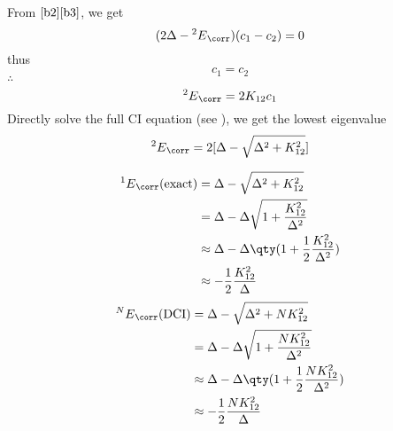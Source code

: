 \documentclass[a4paper]{article}
\begin{document}
From $ \eqref{b2}\eqref{b3} $, we get
\begin{equation}\label{key}
(2\Delta - {^2 E}_{\corr})(c_1 - c_2) = 0
\end{equation}
thus
\begin{equation}\label{key}
c_1 = c_2
\end{equation}
$ \therefore $
\begin{equation}\label{key}
{^2 E}_{\corr} = 2 K_{12} c_1
\end{equation}
\fi
{}
Directly solve the full CI equation (see ), we get the lowest eigenvalue
\begin{equation}\label{key}
{^2 E}_{\corr} = 2[\Delta - \sqrt{\Delta^2 + K_{12}^2}]
\end{equation}

\begin{align}
{^1 E}_{\corr}(\text{exact}) &= \Delta - \sqrt{\Delta^2 + K_{12}^2} \notag\\
&= \Delta - \Delta\sqrt{1 + \dfrac{K_{12}^2}{\Delta^2}} \notag\\
&\approx \Delta - \Delta\qty(1 + \dfrac{1}{2}\dfrac{K_{12}^2}{\Delta^2}) \notag\\
&\approx -\dfrac{1}{2}\dfrac{K_{12}^2}{\Delta}
\end{align}
\begin{align}
{^N E}_{\corr}(\text{DCI}) &= \Delta - \sqrt{\Delta^2 + N K_{12}^2} \notag\\
&= \Delta - \Delta\sqrt{1 + \dfrac{N K_{12}^2}{\Delta^2}} \notag\\
&\approx \Delta - \Delta\qty(1 + \dfrac{1}{2}\dfrac{N K_{12}^2}{\Delta^2}) \notag\\
&\approx -\dfrac{1}{2}\dfrac{N K_{12}^2}{\Delta}
\end{align}
\end{document}
